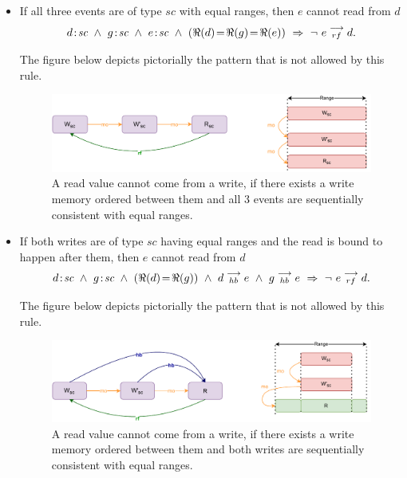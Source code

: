             \begin{itemize}
                \item If all three events are of type $sc$ with equal ranges, then $e$ cannot read from $d$
                    \begin{align*}
                        \et{d}{sc}\ \wedge\ \et{g}{sc}\ \wedge\ \et{e}{sc} 
                        \ \wedge \ (\Re(d) \!=\! \Re(g) \!=\! \Re(e))
                        \ \Rightarrow{} \ 
                        \neg \ \reln{e}{rf}{d}.
                    \end{align*} 
                        
                    The figure below depicts pictorially the pattern that is not allowed by this rule.
                    \begin{figure}[H]
                        \centering 
                        \includegraphics[scale=0.7]{ECMAScriptMemoryModel/SequentialAtomics1.pdf}
                        \caption{A read value cannot come from a write, if there exists a write memory ordered between them and all  3 events are sequentially consistent with equal ranges.}
                    \end{figure}
                    
                \item If both writes are of type $sc$ having equal ranges and the read is bound to happen after them, then $e$ cannot read from $d$ 
                    \begin{align*}
                        d\!:\!\textit{sc}\ \wedge\ g\!:\!\textit{sc}  
                        \ \wedge \ (\Re(d) \!=\! \Re(g)) 
                        \ \wedge \ d\stackrel{\longrightarrow}{_{hb}}e
                        \ \wedge \ g\stackrel{\longrightarrow}{_{hb}}e
                        \ \Rightarrow{}\  
                        \neg \ e\stackrel{\longrightarrow}{_{rf}}d.
                    \end{align*}
                        
                    The figure below depicts pictorially the pattern that is not allowed by this rule.
                    \begin{figure}[H]
                        \centering 
                        \includegraphics[scale=0.7]{ECMAScriptMemoryModel/SequentialAtomics2.pdf}
                        \caption{A read value cannot come from a write, if there exists a write memory ordered between them and both writes are sequentially consistent with equal ranges.}
                    \end{figure}
                

\end{itemize}
